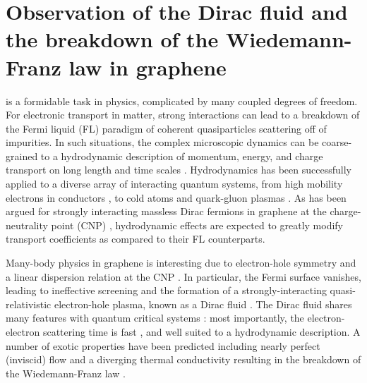 \section{Observation of the Dirac fluid and the breakdown of the Wiedemann-Franz law in graphene}
 is a formidable task in physics, complicated by many coupled degrees of freedom.   For electronic transport in matter, strong interactions can lead to a breakdown of the Fermi liquid (FL) paradigm of coherent quasiparticles scattering off of impurities.  In such situations, the complex microscopic dynamics can be coarse-grained to a hydrodynamic description of momentum, energy, and charge transport on long length and time scales \cite{kadanoff_hydrodynamic_1963}. Hydrodynamics has been successfully applied to a diverse array of interacting quantum systems, from high mobility electrons in conductors \cite{jong_hydrodynamic_1995}, to cold atoms \cite{cao_universal_2011} and quark-gluon plasmas \cite{shuryak_why_2004}.   As has been argued for strongly interacting massless Dirac fermions in graphene at the charge-neutrality point (CNP) \cite{muller_collective_2008, foster_slow_2009, apostolov_hydrodynamic_2014, narozhny_hydrodynamics_2015}, hydrodynamic effects are expected to greatly modify transport coefficients as compared to their FL counterparts.

Many-body physics in graphene is interesting due to electron-hole symmetry and a linear dispersion relation at the CNP \cite{novoselov_two-dimensional_2005, zhang_experimental_2005}. In particular, the Fermi surface vanishes, leading to ineffective screening \cite{siegel_charge-carrier_2013} and the formation of a strongly-interacting quasi-relativistic electron-hole plasma, known as a Dirac fluid \cite{sheehy_quantum_2007}.  The Dirac fluid shares many features with quantum critical systems \cite{keimer_quantum_2011}: most importantly, the electron-electron scattering time is fast \cite{lui_ultrafast_2010, breusing_ultrafast_2009, tielrooij_photoexcitation_2013, johannsen_direct_2013}, and well suited to a hydrodynamic description.   A number of exotic properties have been predicted including nearly perfect (inviscid) flow \cite{muller_graphene:_2009} and a diverging thermal conductivity resulting in the breakdown of the Wiedemann-Franz law \cite{muller_quantum-critical_2008,foster_slow_2009}.


